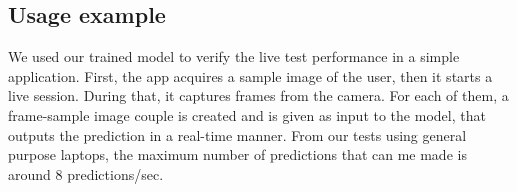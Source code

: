 \subsection{Usage example}
We used our trained model to verify the live test performance in a simple application. First, the app acquires a sample image of the user, then it starts a live session. During that, it captures frames from the camera. For each of them, a frame-sample image couple is created and is given as input to the model, that outputs the prediction in a real-time manner. From our tests using general purpose laptops, the maximum number of predictions that can me made is around 8 predictions/sec.
